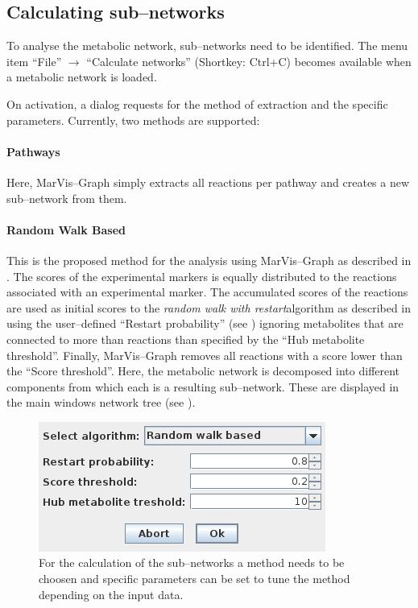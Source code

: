 \documentclass[titlepage,a4paper,twoside,9pt]{article}
\newcommand{\mg}{Mar\-Vis--Graph\xspace}
\newcommand{\rwr}{\textit{random walk with restart}}
\newcommand{\pref}[1]{\prettyref{#1}}
\newcommand{\menu}[3]{``#1'' $\rightarrow$ ``#2'' (Shortkey: Ctrl+#3)}
\begin{document}
\subsection{Calculating sub--networks}\label{ssec:calculate}

To analyse the metabolic network, sub--networks need to be identified. The
menu item \menu{File}{Calculate networks}{C} becomes available when a
metabolic network is loaded. 

On activation, a dialog requests for the method of extraction and the specific
parameters. Currently, two methods are supported:

\paragraph{Pathways} Here, \mg simply extracts all reactions per pathway and
creates a new sub--network from them. 

\paragraph{Random Walk Based} This is the proposed method for the analysis
using \mg as described in \cite{landesfeind2013marvisgraph}. The scores of the
experimental markers is equally distributed to the reactions associated with
an experimental marker. The accumulated scores of the reactions are used as
initial scores to the \rwr algorithm as described in \cite{glaab2012nsea}
using the user--defined ``Restart probability'' (see
\pref{fig:dialog_calculate}) ignoring metabolites that are connected to more
than reactions than specified by the ``Hub metabolite threshold''.
Finally, \mg removes all reactions with a score lower than the ``Score
threshold''. Here, the metabolic network is decomposed into different
components from which each is a resulting sub--network.
These are displayed in the main windows network tree (see \pref{fig:main}).

\begin{figure}
	\begin{center}
		\includegraphics[scale=0.7]{images/dialog_calculate.png}
	\end{center}
	\caption[Calculate sub--networks]{For the calculation of the
		sub--networks a method needs to be choosen and specific parameters can
	be set to tune the method depending on the input data.}
	\label{fig:dialog_calculate}
\end{figure}
\end{document}
